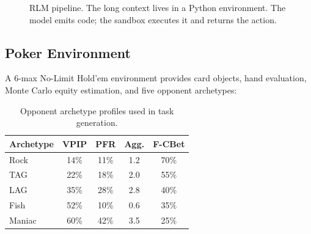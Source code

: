 \documentclass{article}
\begin{document}
\begin{figure}[t]
  \vskip 0.1in
  \centering\small
  \setlength{\fboxsep}{5pt}
  \caption{RLM pipeline. The long context lives in a Python environment.
    The model emits code; the sandbox executes it and returns the action.}
  \label{fig:arch}
  \vskip -0.1in
\end{figure}

\subsection{Poker Environment}

A 6-max No-Limit Hold'em environment provides card objects, hand
evaluation, Monte Carlo equity estimation, and five opponent archetypes:

\begin{table}[h]
  \caption{Opponent archetype profiles used in task generation.}
  \label{tab:archetypes}
  \vskip 0.05in
  \begin{center}\small
  \begin{tabular}{@{}lcccc@{}}
    \toprule
    Archetype & VPIP & PFR & Agg. & F-CBet \\
    \midrule
    Rock   & 14\% & 11\% & 1.2 & 70\% \\
    TAG    & 22\% & 18\% & 2.0 & 55\% \\
    LAG    & 35\% & 28\% & 2.8 & 40\% \\
    Fish   & 52\% & 10\% & 0.6 & 35\% \\
    Maniac & 60\% & 42\% & 3.5 & 25\% \\
    \bottomrule
  \end{tabular}
  \end{center}
  \vskip -0.1in
\end{table}
\end{document}
